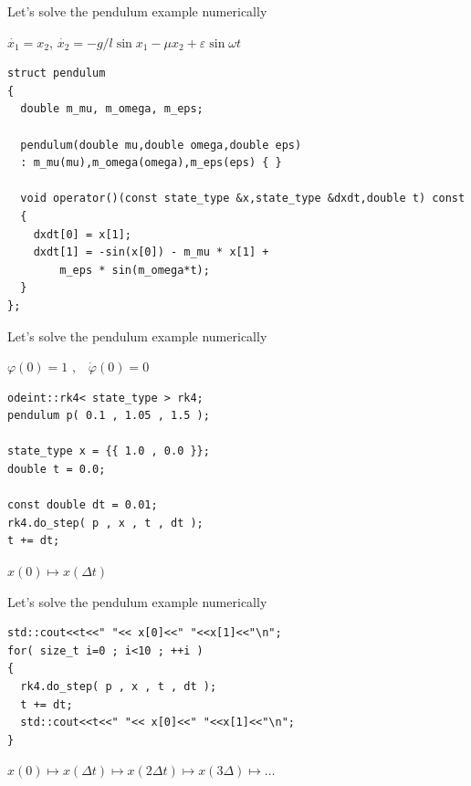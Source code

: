 \begin{frame}[fragile]

\centerline{ \Large Let's solve the pendulum example numerically}

\vspace{2ex}

$\dot{x_1} = x_2$, $\dot{x_2} = - g / l \sin x_1 - \mu x_2 + \varepsilon \sin \omega t$

\vspace{2ex}

\begin{lstlisting}
struct pendulum
{
  double m_mu, m_omega, m_eps;

  pendulum(double mu,double omega,double eps)
  : m_mu(mu),m_omega(omega),m_eps(eps) { }

  void operator()(const state_type &x,state_type &dxdt,double t) const
  {
    dxdt[0] = x[1];
    dxdt[1] = -sin(x[0]) - m_mu * x[1] +
        m_eps * sin(m_omega*t);
  }
};
\end{lstlisting}

\end{frame}

\begin{frame}[fragile]
 \centerline{ \Large Let's solve the pendulum example numerically}

\vspace{2ex}
$\varphi(0) = 1 \,\, \text{,} \quad \dot{\varphi}(0) = 0$
\vspace{2ex}

\begin{lstlisting}
odeint::rk4< state_type > rk4;
pendulum p( 0.1 , 1.05 , 1.5 );

state_type x = {{ 1.0 , 0.0 }};
double t = 0.0;

const double dt = 0.01;
rk4.do_step( p , x , t , dt );
t += dt;
\end{lstlisting}

\vspace{2ex}

$x(0) \mapsto x(\Delta t)$

\end{frame}

\begin{frame}[fragile]
 \centerline{ \Large Let's solve the pendulum example numerically}

\vspace{2ex}


\begin{lstlisting}
std::cout<<t<<" "<< x[0]<<" "<<x[1]<<"\n";
for( size_t i=0 ; i<10 ; ++i )
{
  rk4.do_step( p , x , t , dt );
  t += dt;
  std::cout<<t<<" "<< x[0]<<" "<<x[1]<<"\n";
}
\end{lstlisting}

\vspace{2ex}

$x(0) \mapsto x(\Delta t) \mapsto x(2\Delta t) \mapsto x(3\Delta) \mapsto \dots$

\end{frame}


